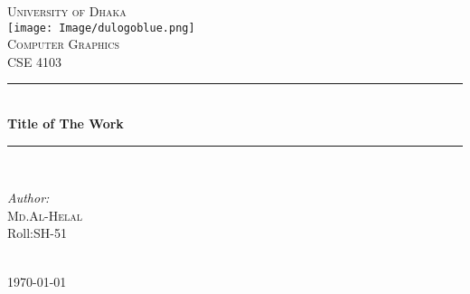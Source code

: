 \documentclass[12pt,a4paper]{article}
\begin{document}
\begin{titlepage}

\newcommand{\HRule}{\rule{\linewidth}{0.5mm}} %

\center %
 

\textsc{\LARGE University of Dhaka}\\[1.5cm] %
\texttt{[image: Image/dulogoblue.png]}\\[1cm] %
\textsc{\Large Computer Graphics}\\[0.5cm] %
\textsc{\large CSE 4103}\\[0.5cm] %


\HRule \\[0.4cm]
{ \huge \bfseries Title of The Work}\\[0.4cm] %
\HRule \\[1.5cm]
 

\begin{minipage}{0.4\textwidth}
\begin{flushleft} \large
\emph{Author:}\\
\textsc{Md.Al-Helal}\\Roll:SH-51\\ %
\end{flushleft}

\end{minipage}\\[2cm]


{\large \today}\\[2cm] %

\vfill %

\end{titlepage}
\end{document}
